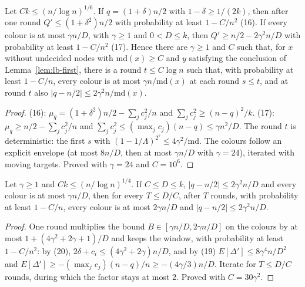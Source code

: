 \begin{lemma}\label{lem:lb-descent}
\leanok{}
Let $Ck\le(n/\log n)^{1/6}$. If $q=(1+\delta)n/2$ with $1-\delta\ge1/(2k)$, then after one round
$Q'\le(1+\delta^2)n/2$ with probability at least $1-C/n^2$ (16). If every colour is at most
$\gamma n/D$, with $\gamma\ge1$ and $0<D\le k$, then $Q'\ge n/2-2\gamma^2n/D$ with probability at
least $1-C/n^2$ (17). Hence there are $\gamma\ge1$ and $C$ such that, for $x$ without
undecided nodes with $\mathrm{md}(x)\ge C$ and $y$ satisfying the conclusion of
Lemma~\ref{lem:lb-first}, there is a round $t\le C\log n$ such that, with probability at least
$1-C/n$, every colour is at most $\gamma n/\mathrm{md}(x)$ at each round $s\le t$, and at round $t$
also $|q-n/2|\le2\gamma^2n/\mathrm{md}(x)$.
\end{lemma}
\begin{proof}\leanok
(16): $\mu_q=(1+\delta^2)n/2-\sum_jc_j^2/n$ and $\sum_jc_j^2\ge(n-q)^2/k$. (17):
$\mu_q\ge n/2-\sum_jc_j^2/n$ and $\sum_jc_j^2\le(\max_jc_j)(n-q)\le\gamma n^2/D$. The round $t$ is
deterministic: the first $s$ with $(1-1/\Lambda)^{2^s}\le4\gamma^2/\mathrm{md}$. The colours follow
an explicit envelope (at most $8n/D$, then at most $\gamma n/D$ with $\gamma=24$), iterated with
moving targets. Proved with $\gamma=24$ and $C=10^6$.
\end{proof}

\begin{lemma}\label{lem:lb-plateau}
\leanok{}
Let $\gamma\ge1$ and $Ck\le(n/\log n)^{1/4}$. If $C\le D\le k$, $|q-n/2|\le2\gamma^2n/D$ and every
colour is at most $\gamma n/D$, then for every $T\le D/C$, after $T$ rounds, with probability at
least $1-C/n$, every colour is at most $2\gamma n/D$ and $|q-n/2|\le2\gamma^2n/D$.
\end{lemma}
\begin{proof}\leanok
One round multiplies the bound $B\in[\gamma n/D,2\gamma n/D]$ on the colours by at most
$1+(4\gamma^2+2\gamma+1)/D$ and keeps the window, with probability at least $1-C/n^2$: by (20),
$2\delta+c_i\le(4\gamma^2+2\gamma)n/D$, and by (19) $E[\Delta']\le 8\gamma^4n/D^2$ and
$E[\Delta']\ge-(\max_jc_j)(n-q)/n\ge-(4\gamma/3)n/D$. Iterate for $T\le D/C$ rounds, during which
the factor stays at most $2$. Proved with $C=30\gamma^2$.
\end{proof}

